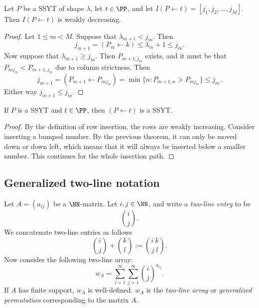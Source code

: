 \documentclass{article}
\begin{document}
\begin{theorem}
    Let $P$ be a SSYT of shape $\lambda$, let $t \in \PP$, and let $I(P\leftarrow t) = [j_1,j_2,\ldots,j_M]$. Then $I(P\leftarrow t)$ is weakly decreasing.
\end{theorem}

\begin{proof}
    Let $1 \leq m < M$.
    Suppose that $\lambda_{m+1} < j_m$. Then 
    \[
        j_{m+1} = (P_m \leftarrow k) \leq \lambda_m+1 \leq j_m.
    \]
    Now suppose that $\lambda_{m+1} \geq j_m$. 
    Then $P_{m+1,j_m}$ exists, and it must be that $P_{mj_m} < P_{m+1,j_m}$ due to column strictness. Then
    \[
        j_{m+1} = (P_{m+1} \leftarrow P_{mj_m}) = \min \{n:P_{m+1,n}>P_{mj_m}\} \leq j_m.
    \]
    Either way $j_{m+1} \leq j_m$.
\end{proof}

\begin{corollary}
    If $P$ is a SSYT and $t \in \PP$, then $(P \leftarrow t)$ is a SSYT.
\end{corollary}

\begin{proof}
    By the definition of row insertion, the rows are weakly increasing. Consider inserting a bumped number. By the previous theorem, it can only be moved down or down left, which means that it will always be inserted below a smaller number. This continues for the whole insertion path.
\end{proof}

\subsection{Generalized two-line notation}

\begin{definition}
    Let $A = (a_{ij})$ be a $\NN$-matrix. Let $i, j \in \NN$, and write a \textit{two-line entry} to be
    \[
        \binom{i}{j}.
    \]
    We concatenate two-line entries as follows
    \[
        \binom{i}{j} + \binom{k}{l} := \binom{i\:k}{j\:l}.
    \]
    Now consider the following two-line array:
    \[
        w_A = \sum_{i=1}^\infty \sum_{j=1}^\infty \binom{i}{j}^{a_{ij}}.
    \]
    If $A$ has finite support, $w_A$ is well-defined. 
    $w_A$ is the \textit{two-line array} or \textit{generalized permutation} corresponding to the matrix $A$.
\end{definition}
\end{document}

